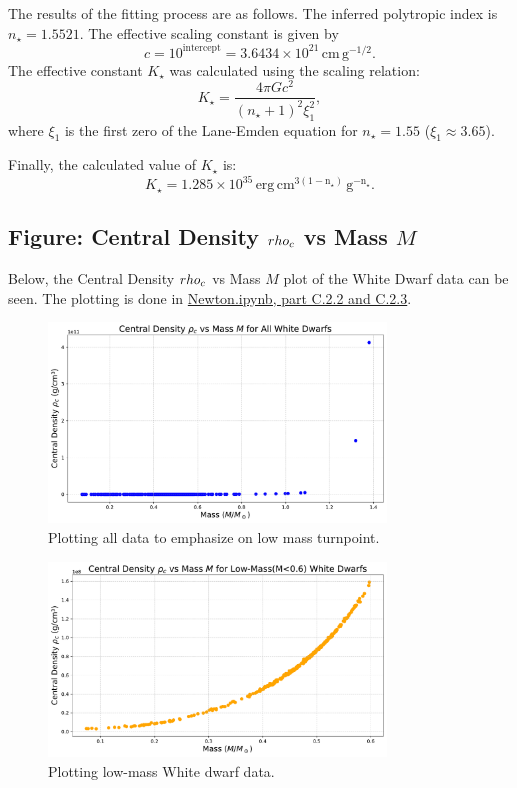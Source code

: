 \documentclass[12pt]{article}
\begin{document}
The results of the fitting process are as follows. The inferred polytropic index is \( n_\star = 1.5521 \). The effective scaling constant is given by
\[
c = 10^{\text{intercept}} = 3.6434 \times 10^{21} \, \mathrm{cm \, g^{-1/2}}.
\]
The effective constant \( K_\star \) was calculated using the scaling relation:
\[
K_\star = \frac{4 \pi G c^2}{(n_\star + 1)^2 \xi_1^2},
\]
where \( \xi_1 \) is the first zero of the Lane-Emden equation for \( n_\star = 1.55 \) (\( \xi_1 \approx 3.65 \)).

Finally, the calculated value of \( K_\star \) is:
\[
K_\star = 1.285 \times 10^{35} \, \mathrm{erg \, cm^{3(1-n_\star)} \, g^{-n_\star}}.
\]

\subsection{Figure: Central Density $\\rho_c$ vs Mass $M$}

Below, the Central Density $\\rho_c$ vs Mass $M$ plot of the White Dwarf data can be seen. The plotting is done in \href{Newton.ipynb}{Newton.ipynb, part C.2.2 and C.2.3}.

\begin{figure}[H] %
    \centering
    \includegraphics[width=0.8\textwidth]{Newton_PartC2.2.pdf}
    \caption{Plotting all data to emphasize on low mass turnpoint.}
    \label{fig:newton-partc2.2}
\end{figure}

\begin{figure}[H] %
    \centering
    \includegraphics[width=0.8\textwidth]{Newton_PartC2.3.pdf}
    \caption{Plotting low-mass White dwarf data.}
    \label{fig:newton-partc2.3}
\end{figure}
\end{document}
